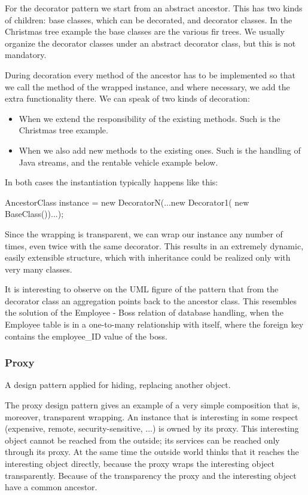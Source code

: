 \documentclass[margin=0px]{article}
\begin{document}
For the decorator pattern we start from an abstract ancestor. This has two kinds of children: base classes, which can be decorated, and decorator classes. In the Christmas tree example the base classes are the various fir trees. We usually organize the decorator classes under an abstract decorator class, but this is not mandatory.

During decoration every method of the ancestor has to be implemented so that we call the method of the wrapped instance, and where necessary, we add the extra functionality there. We can speak of two kinds of decoration:
\begin{itemize}
    \item When we extend the responsibility of the existing methods. Such is the Christmas tree example.
    \item When we also add new methods to the existing ones. Such is the handling of Java streams, and the rentable vehicle example below.
\end{itemize}

In both cases the instantiation typically happens like this:

AncestorClass instance = new DecoratorN(...new Decorator1( new BaseClass())...);

Since the wrapping is transparent, we can wrap our instance any number of times, even twice with the same decorator. This results in an extremely dynamic, easily extensible structure, which with inheritance could be realized only with very many classes.

It is interesting to observe on the UML figure of the pattern that from the decorator class an aggregation points back to the ancestor class. This resembles the solution of the Employee - Boss relation of database handling, when the Employee table is in a one-to-many relationship with itself, where the foreign key contains the employee\_ID value of the boss.

\subsubsection{Proxy}
A design pattern applied for hiding, replacing another object.

The proxy design pattern gives an example of a very simple composition that is, moreover, transparent wrapping. An instance that is interesting in some respect (expensive, remote, security-sensitive, ...) is owned by its proxy. This interesting object cannot be reached from the outside; its services can be reached only through its proxy. At the same time the outside world thinks that it reaches the interesting object directly, because the proxy wraps the interesting object transparently. Because of the transparency the proxy and the interesting object have a common ancestor.
\end{document}
